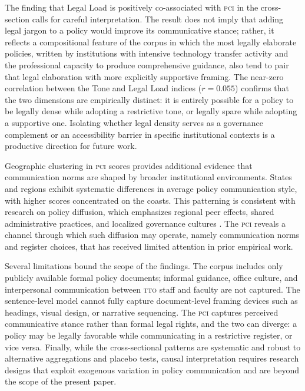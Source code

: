 \documentclass[12pt]{article}
\newcommand{\PCI}{\textsc{pci}}
\newcommand{\TTO}{\textsc{tto}}
\begin{document}
The finding that Legal Load is positively co-associated with \PCI{} in the
cross-section calls for careful interpretation.  The result does not imply that adding
legal jargon to a policy would improve its communicative stance; rather, it reflects
a compositional feature of the corpus in which the most legally elaborate policies,
written by institutions with intensive technology transfer activity and the professional
capacity to produce comprehensive guidance, also tend to pair that legal elaboration
with more explicitly supportive framing.  The near-zero correlation between the Tone
and Legal Load indices ($r = 0.055$) confirms that the two dimensions are empirically
distinct: it is entirely possible for a policy to be legally dense while adopting a
restrictive tone, or legally spare while adopting a supportive one.  Isolating whether
legal density serves as a governance complement or an accessibility barrier in specific
institutional contexts is a productive direction for future work.

Geographic clustering in \PCI{} scores provides additional evidence that communication
norms are shaped by broader institutional environments.  States and regions exhibit
systematic differences in average policy communication style, with higher scores
concentrated on the coasts.  This patterning is consistent with research on policy
diffusion, which emphasizes regional peer effects, shared administrative practices, and
localized governance cultures \citep{Nelson1993, Borras2013}.  The \PCI{} reveals a
channel through which such diffusion may operate, namely communication norms and
register choices, that has received limited attention in prior empirical work.

Several limitations bound the scope of the findings.  The corpus includes only publicly
available formal policy documents; informal guidance, office culture, and interpersonal
communication between \TTO{} staff and faculty are not captured.  The sentence-level
model cannot fully capture document-level framing devices such as headings, visual
design, or narrative sequencing.  The \PCI{} captures perceived communicative stance
rather than formal legal rights, and the two can diverge: a policy may be legally
favorable while communicating in a restrictive register, or vice versa.  Finally, while
the cross-sectional patterns are systematic and robust to alternative aggregations and
placebo tests, causal interpretation requires research designs that exploit exogenous
variation in policy communication and are beyond the scope of the present paper.
\end{document}
